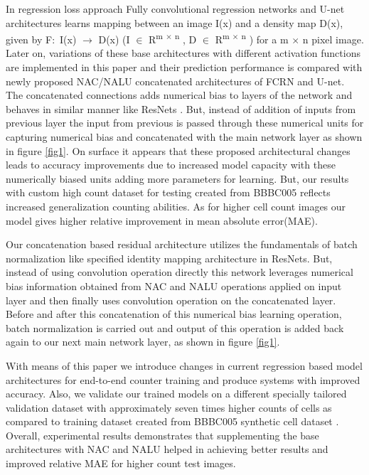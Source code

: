 \documentclass[conference]{IEEEtran}
\begin{document}
In regression loss approach Fully convolutional regression networks \cite{b2} and U-net \cite{b8} architectures learns mapping  between an image I(x) and a density map D(x), given by F$\colon$ I(x) $\rightarrow$ D(x) (I $\in$ R\textsuperscript{m $\times$ n} , D $\in$ R\textsuperscript{m $\times$ n} ) for a m $\times$ n pixel image. Later on, variations of these base architectures with different activation functions are implemented in this paper and their prediction performance is compared with newly proposed NAC/NALU concatenated architectures of FCRN and U-net. The concatenated connections adds numerical bias to layers of the network and behaves in similar manner like ResNets \cite{b9}. But, instead of addition of inputs from previous layer the input from previous is passed through these numerical units for capturing numerical bias and concatenated with the main network layer as shown in figure \ref{fig1}. On surface it appears that these proposed architectural changes leads to accuracy improvements due to increased model capacity with these numerically biased units adding more parameters for learning. But, our results with custom high count dataset for testing created from BBBC005 \cite{b10} reflects increased generalization counting abilities. As for higher cell count images our model gives higher relative improvement in mean absolute error(MAE).

Our concatenation based residual architecture utilizes the fundamentals of batch normalization like specified identity mapping architecture \cite{b11} in ResNets. But, instead of using convolution operation directly this network leverages numerical bias information obtained from NAC and NALU operations applied on input layer and then finally uses convolution operation on the concatenated layer. Before and after this concatenation of this numerical bias learning operation, batch normalization is carried out and output of this operation is added back again to our next main network layer, as shown in figure  \ref{fig1}.

With means of this paper we introduce changes in current regression based model architectures for end-to-end counter training and produce systems with improved accuracy. Also, we validate our trained models on a different specially tailored validation dataset with approximately seven times higher counts of cells as compared to training dataset created from BBBC005 synthetic cell dataset \cite{b10}. Overall, experimental results demonstrates that supplementing the base architectures with NAC and NALU helped in achieving better results and improved relative MAE for higher count test images. 
\end{document}
